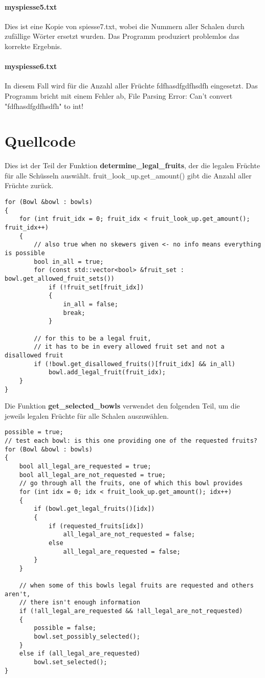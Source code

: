 \documentclass[a4paper,10pt,ngerman]{scrartcl}
\begin{document}
\paragraph{myspiesse5.txt}
Dies ist eine Kopie von spiesse7.txt, wobei die Nummern aller Schalen durch zufällige Wörter ersetzt wurden.
Das Programm produziert problemlos das korrekte Ergebnis.

\paragraph{myspiesse6.txt}
In diesem Fall wird für die Anzahl aller Früchte \glqq fdfhasdfgdfhsdfh\grqq{} eingesetzt.
Das Programm bricht mit einem Fehler ab, \glqq File Parsing Error: Can't convert "fdfhasdfgdfhsdfh" to int!\grqq{}

\section{Quellcode}
Dies ist der Teil der Funktion \textbf{determine\_legal\_fruits}, der die legalen Früchte für alle Schüsseln auswählt.
\glqq fruit\_look\_up.get\_amount()\grqq{} gibt die Anzahl aller Früchte zurück.
\begin{lstlisting}
for (Bowl &bowl : bowls)
{
    for (int fruit_idx = 0; fruit_idx < fruit_look_up.get_amount(); fruit_idx++)
    {
        // also true when no skewers given <- no info means everything is possible
        bool in_all = true;
        for (const std::vector<bool> &fruit_set : bowl.get_allowed_fruit_sets())
            if (!fruit_set[fruit_idx])
            {
                in_all = false;
                break;
            }

        // for this to be a legal fruit,
        // it has to be in every allowed fruit set and not a disallowed fruit
        if (!bowl.get_disallowed_fruits()[fruit_idx] && in_all)
            bowl.add_legal_fruit(fruit_idx);
    }
}
\end{lstlisting}

Die Funktion \textbf{get\_selected\_bowls} verwendet den folgenden Teil, um die jeweils legalen Früchte für alle Schalen auszuwählen.
\begin{lstlisting}
possible = true;
// test each bowl: is this one providing one of the requested fruits?
for (Bowl &bowl : bowls)
{
    bool all_legal_are_requested = true;
    bool all_legal_are_not_requested = true;
    // go through all the fruits, one of which this bowl provides
    for (int idx = 0; idx < fruit_look_up.get_amount(); idx++)
    {
        if (bowl.get_legal_fruits()[idx])
        {
            if (requested_fruits[idx])
                all_legal_are_not_requested = false;
            else
                all_legal_are_requested = false;
        }
    }

    // when some of this bowls legal fruits are requested and others aren't,
    // there isn't enough information
    if (!all_legal_are_requested && !all_legal_are_not_requested)
    {
        possible = false;
        bowl.set_possibly_selected();
    }
    else if (all_legal_are_requested)
        bowl.set_selected();
}
\end{lstlisting}
\end{document}
